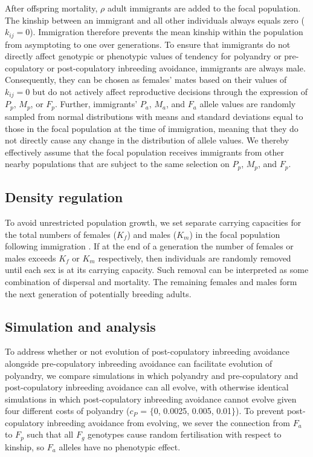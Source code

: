 \documentclass[12pt]{article}
\begin{document}
After offspring mortality, $\rho$ adult immigrants are added to the focal population. The kinship between an immigrant and all other individuals always equals zero ($k_{ij}=0$). Immigration therefore prevents the mean kinship within the population from asymptoting to one over generations. To ensure that immigrants do not directly affect genotypic or phenotypic values of tendency for polyandry or pre-copulatory or post-copulatory inbreeding avoidance, immigrants are always male. Consequently, they can be chosen as females' mates based on their values of $k_{ij}=0$ but do not actively affect reproductive decisions through the expression of $P_{p}$, $M_{p}$, or $F_{p}$. Further, immigrants' $P_{a}$, $M_{a}$, and $F_{a}$ allele values are randomly sampled from normal distributions with means and standard deviations equal to those in the focal population at the time of immigration, meaning that they do not directly cause any change in the distribution of allele values. We thereby effectively assume that the focal population receives immigrants from other nearby populations that are subject to the same selection on $P_{p}$, $M_{p}$, and $F_{p}$.

\subsection*{Density regulation}

To avoid unrestricted population growth, we set separate carrying capacities for the total numbers of females ($K_{f}$) and males ($K_{m}$) in the focal population following immigration \cite[][]{Guillaume2009, Duthie}. If at the end of a generation the number of females or males exceeds $K_{f}$ or $K_{m}$  respectively, then individuals are randomly removed until each sex is at its carrying capacity. Such removal can be interpreted as some combination of dispersal and mortality. The remaining females and males form the next generation of potentially breeding adults.

\subsection*{Simulation and analysis}

To address whether or not evolution of post-copulatory inbreeding avoidance alongside pre-copulatory inbreeding avoidance can facilitate evolution of polyandry, we compare simulations in which polyandry and pre-copulatory and post-copulatory inbreeding avoidance can all evolve, with otherwise identical simulations in which post-copulatory inbreeding avoidance cannot evolve given four different costs of polyandry ($c_{P}$ = $\{$0, 0.0025, 0.005,  0.01$\}$). To prevent post-copulatory inbreeding avoidance from evolving, we sever the connection from $F_{a}$ to $F_{p}$ such that all $F_{g}$ genotypes cause random fertilisation with respect to kinship, so $F_{a}$ alleles have no phenotypic effect.
\end{document}
